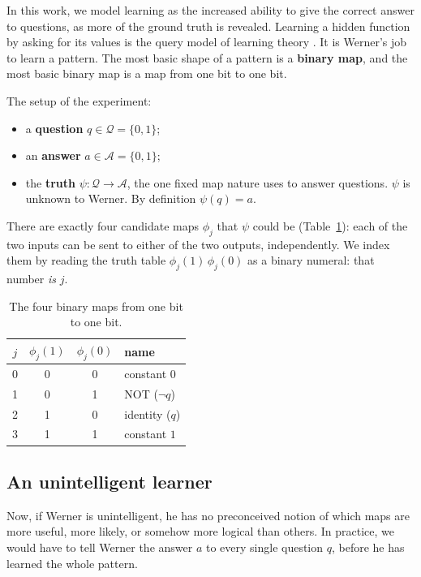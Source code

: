 \documentclass[11pt]{article}
\begin{document}
In this work, we model learning as the increased ability to give the
correct answer to questions, as more of the ground truth is revealed.
Learning a hidden function by asking for its values is the query model
of learning theory \cite{angluin88}.
It is Werner's job to learn a pattern. The most basic shape of a
pattern is a \textbf{binary map}, and the most basic binary map is a map
from one bit to one bit.

The setup of the experiment:
\begin{itemize}
  \item a \textbf{question} $q \in \mathcal Q = \{0,1\}$;
  \item an \textbf{answer} $a \in \mathcal A = \{0,1\}$;
  \item the \textbf{truth} $\psi: \mathcal Q \to \mathcal A$, the one fixed map nature
    uses to answer questions. $\psi$ is unknown to Werner. By definition $\psi(q) = a$.
\end{itemize}
There are exactly four candidate maps $\phi_j$ that $\psi$ could be
(Table~\ref{tab:fourmaps}): each of the two inputs can be sent to
either of the two outputs, independently. We index them by reading
the truth table $\phi_j(1)\,\phi_j(0)$ as a binary numeral: that
number \emph{is} $j$.

\begin{table}[H]
\centering
\begin{tabular}{c cc l}
\toprule
$j$ & $\phi_j(1)$ & $\phi_j(0)$ & name \\
\midrule
0 & 0 & 0 & constant $0$ \\
1 & 0 & 1 & NOT ($\lnot q$) \\
2 & 1 & 0 & identity ($q$) \\
3 & 1 & 1 & constant $1$ \\
\bottomrule
\end{tabular}
\caption{The four binary maps from one bit to one bit.}
\label{tab:fourmaps}
\end{table}

\subsection{An unintelligent learner}\label{sec:unintelligent}

Now, if Werner is unintelligent, he has no preconceived notion of
which maps are more useful, more likely, or somehow more logical than
others. In practice, we would have to tell Werner the answer $a$ to every single question $q$,
before he has learned the whole pattern. 
\end{document}
